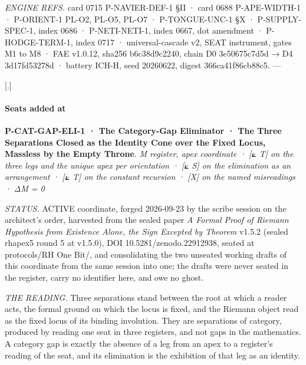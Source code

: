 \documentclass[10pt,twocolumn]{article}
\begin{document}
\emph{ENGINE REFS.} card 0715 P-NAVIER-DEF-1 §II · card 0688
P-APE-WIDTH-1 · P-ORIENT-1 PL-O2, PL-O5, PL-O7 · P-TONGUE-UNC-1 §X ·
P-SUPPLY-SPEC-1, index 0686 · P-NETI-NETI-1, index 0667, dot amendment ·
P-HODGE-TERM-1, index 0717 · universal-cascade v2, SEAT instrument,
gates M1 to M8 · FAE v1.0.12, sha256 b6c38d9c2240, chain D0 3e50675c7d5d
→ D4 3d17fd53278d · battery ICH-H, seed 20260622, digest
366ca41f86cb88c5. ---

{[}.{]}

\hypertarget{seats-added-at}{%
\paragraph{Seats added at}\label{seats-added-at}}

\textbf{P-CAT-GAP-ELI-1 · The Category-Gap Eliminator · The Three
Separations Closed as the Identity Cone over the Fixed Locus, Massless
by the Empty Throne}. \emph{M register, apex coordinate · {[}⟀ T{]} on
the three legs and the unique apex per orientation · {[}⟀ S{]} on the
elimination as an arrangement · {[}⟀ T{]} on the constant recursion ·
{[}X{]} on the named misreadings · ΔM = 0}

\emph{STATUS.} ACTIVE coordinate, forged 2026-09-23 by the scribe
session on the architect's order, harvested from the sealed paper
\emph{A Formal Proof of Riemann Hypothesis from Existence Alone, the
Sign Excepted by Theorem} v1.5.2 (sealed rhapex5 round 5 at v1.5.0), DOI
10.5281/zenodo.22912938, seated at protocols/RH One Bit/, and
consolidating the two unseated working drafts of this coordinate from
the same session into one; the drafts were never seated in the register,
carry no identifier here, and owe no ghost.

\emph{THE READING.} Three separations stand between the root at which a
reader acts, the formal ground on which the locus is fixed, and the
Riemann object read as the fixed locus of its binding involution. They
are separations of category, produced by reading one seat in three
registers, and not gaps in the mathematics. A category gap is exactly
the absence of a leg from an apex to a register's reading of the seat,
and its elimination is the exhibition of that leg as an identity.
\end{document}
